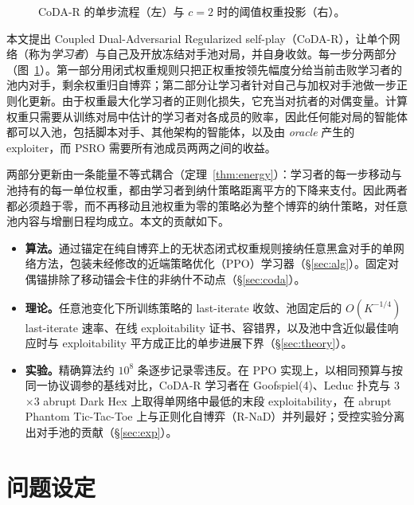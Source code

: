 \documentclass{article}
\theoremstyle{plain}
\theoremstyle{remark}
\newcommand{\codar}{CoDA-R}
\begin{document}
\begin{figure}[t]
\begin{center}

\end{center}
\vspace{-4pt}
\caption{\codar{} 的单步流程（左）与 $c=2$ 时的阈值权重投影（右）。}
\label{fig:overview}
\end{figure}

本文提出 Coupled Dual-Adversarial Regularized self-play（\codar{}），让单个网络（称为\emph{学习者}）与自己及开放冻结对手池对局，并自身收敛。每一步分两部分（图~\ref{fig:overview}）。第一部分用闭式权重规则只把正权重按领先幅度分给当前击败学习者的池内对手，剩余权重归自博弈；第二部分让学习者针对自己与加权对手池做一步正则化更新。由于权重最大化学习者的正则化损失，它充当对抗者的对偶变量。计算权重只需要从训练对局中估计的学习者对各成员的败率，因此任何能对局的智能体都可以入池，包括脚本对手、其他架构的智能体，以及由 \emph{oracle} 产生的 exploiter，而 PSRO 需要所有池成员两两之间的收益。

两部分更新由一条能量不等式耦合（定理~\ref{thm:energy}）：学习者的每一步移动与池持有的每一单位权重，都由学习者到纳什策略距离平方的下降来支付。因此两者都必须趋于零，而不再移动且池权重为零的策略必为整个博弈的纳什策略，对任意池内容与增删日程均成立。本文的贡献如下。
\begin{itemize}
\item \textbf{算法。}通过锚定在纯自博弈上的无状态闭式权重规则接纳任意黑盒对手的单网络方法，包装未经修改的近端策略优化（PPO）\citep{schulman2017ppo}学习器（\S\ref{sec:alg}）。固定对偶锚排除了移动锚会卡住的非纳什不动点（\S\ref{sec:coda}）。
\item \textbf{理论。}任意池变化下所训练策略的 last-iterate 收敛、池固定后的 $O(K^{-1/4})$ last-iterate 速率、在线 exploitability 证书、容错界，以及池中含近似最佳响应时与 exploitability 平方成正比的单步进展下界（\S\ref{sec:theory}）。
\item \textbf{实验。}精确算法约 $10^8$ 条逐步记录零违反。在 PPO 实现上，以相同预算与按同一协议调参的基线对比，\codar{} 学习者在 Goofspiel(4)、Leduc 扑克与 3$\times$3 abrupt Dark Hex 上取得单网络中最低的末段 exploitability，在 abrupt Phantom Tic-Tac-Toe 上与正则化自博弈（R-NaD）并列最好；受控实验分离出对手池的贡献（\S\ref{sec:exp}）。
\end{itemize}

\section{问题设定}
\label{sec:prelim}
\end{document}
